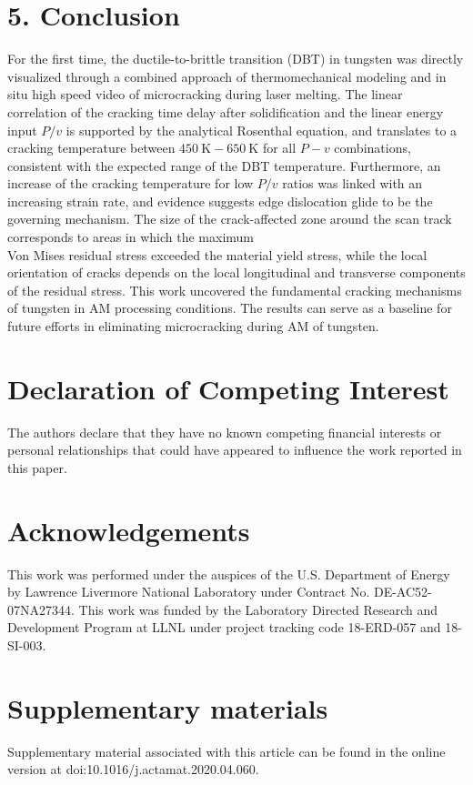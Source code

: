 \documentclass[10pt]{article}
\begin{document}
\section*{5. Conclusion}
For the first time, the ductile-to-brittle transition (DBT) in tungsten was directly visualized through a combined approach of thermomechanical modeling and in situ high speed video of microcracking during laser melting. The linear correlation of the cracking time delay after solidification and the linear energy input $P / v$ is supported by the analytical Rosenthal equation, and translates to a cracking temperature between $450 \mathrm{~K}-650 \mathrm{~K}$ for all $P-v$ combinations, consistent with the expected range of the DBT temperature. Furthermore, an increase of the cracking temperature for low $P / v$ ratios was linked with an increasing strain rate, and evidence suggests edge dislocation glide to be the governing mechanism. The size of the crack-affected zone around the scan track corresponds to areas in which the maximum\\
Von Mises residual stress exceeded the material yield stress, while the local orientation of cracks depends on the local longitudinal and transverse components of the residual stress. This work uncovered the fundamental cracking mechanisms of tungsten in AM processing conditions. The results can serve as a baseline for future efforts in eliminating microcracking during AM of tungsten.

\section*{Declaration of Competing Interest}
The authors declare that they have no known competing financial interests or personal relationships that could have appeared to influence the work reported in this paper.

\section*{Acknowledgements}
This work was performed under the auspices of the U.S. Department of Energy by Lawrence Livermore National Laboratory under Contract No. DE-AC52-07NA27344. This work was funded by the Laboratory Directed Research and Development Program at LLNL under project tracking code 18-ERD-057 and 18-SI-003.

\section*{Supplementary materials}
Supplementary material associated with this article can be found in the online version at doi:10.1016/j.actamat.2020.04.060.
\end{document}
